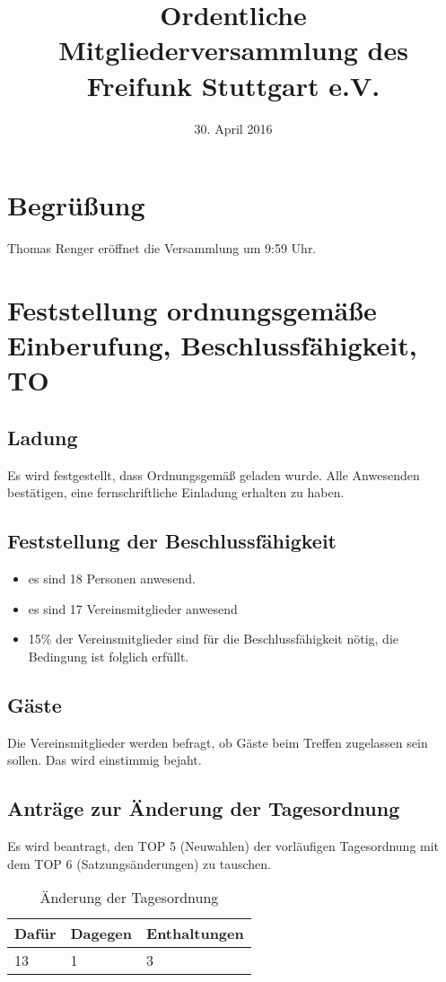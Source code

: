 \documentclass[a4paper]{scrartcl}
\date{30. April 2016}
\title{Ordentliche Mitgliederversammlung des Freifunk Stuttgart e.V.}
\begin{document}
\maketitle

\tableofcontents

\clearpage

\listoftables

\clearpage

\section{Begrüßung}
Thomas Renger eröffnet die Versammlung um  9:59 Uhr.

\section{Feststellung ordnungsgemäße Einberufung, Beschlussfähigkeit, TO}
\subsection{Ladung}
Es wird festgestellt, dass Ordnungsgemäß geladen wurde. Alle Anwesenden bestätigen, eine fernschriftliche Einladung erhalten zu haben.

\subsection{Feststellung der Beschlussfähigkeit}
\begin{itemize}
\item es sind 18 Personen anwesend.
\item es sind 17 Vereinsmitglieder anwesend
\item 15\% der Vereinsmitglieder sind für die Beschlussfähigkeit nötig, die Bedingung ist folglich erfüllt.
\end{itemize}
\subsection{Gäste} 
Die Vereinsmitglieder werden befragt, ob Gäste beim Treffen zugelassen sein sollen. Das wird einstimmig bejaht.

\subsection{Anträge zur Änderung der Tagesordnung}
Es wird beantragt, den TOP 5 (Neuwahlen) der vorläufigen Tagesordnung mit dem TOP 6 (Satzungsänderungen) zu tauschen.
\begin{table}[h]
	\begin{tabularx}{\textwidth}{XXX}
		Dafür & Dagegen & Enthaltungen\\
		\toprule
		13 & 1 & 3\\
	\end{tabularx}
	\caption{Änderung der Tagesordnung}
\end{table}
\end{document}
